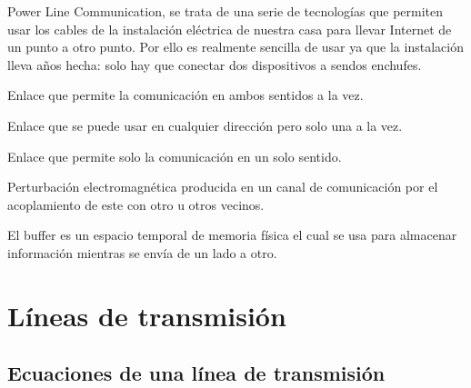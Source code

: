 \documentclass[
	12pt, %
	fleqn, %
	a4paper, %
	oneside, %
]{LegrandOrangeBook}
\begin{document}
\begin{vocabulary}[PLC]
Power Line Communication, se trata de una serie de tecnologías que permiten usar los cables de la instalación eléctrica de nuestra casa para llevar Internet de un punto a otro punto. Por ello es realmente sencilla de usar ya que la instalación lleva años hecha: solo hay que conectar dos dispositivos a sendos enchufes.
\end{vocabulary}
\begin{vocabulary}
Enlace que permite la comunicación en ambos sentidos a la vez.
\end{vocabulary}
\begin{vocabulary}
Enlace que se puede usar en cualquier dirección pero solo una a la vez.
\end{vocabulary}
\begin{vocabulary}[Simplex]
Enlace que permite solo la comunicación en un solo sentido.
\end{vocabulary}
\begin{vocabulary}[Diafonía]
Perturbación electromagnética producida en un canal de comunicación por el acoplamiento de este con otro u otros vecinos.
\end{vocabulary}
\begin{vocabulary}[Buffer]
El buffer es un espacio temporal de memoria física el cual se usa para almacenar información mientras se envía de un lado a otro.
\end{vocabulary}
\part{Líneas de transmisión}
\chapter{Ecuaciones de una línea de transmisión}
\end{document}
